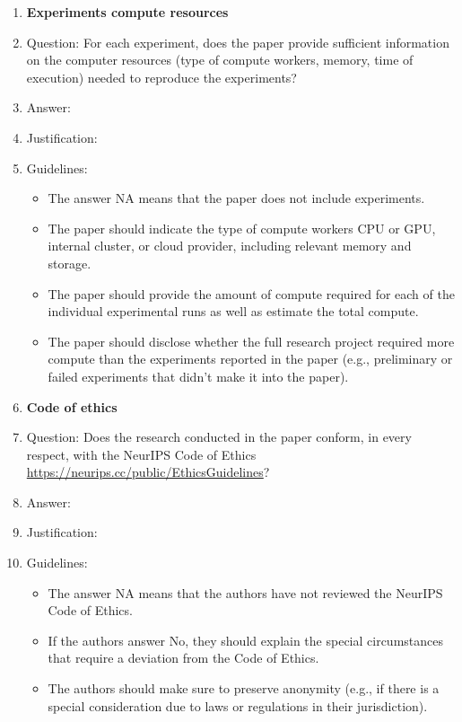 \documentclass{article}
\theoremstyle{definition} \newtheorem{definition}{Definition}  \newtheorem{example}{Example}
\theoremstyle{remark} \newtheorem{remark}{Remark}
\newcounter{ct}
\begin{document}
\begin{enumerate}
\item {\bf Experiments compute resources}
    \item[] Question: For each experiment, does the paper provide sufficient information on the computer resources (type of compute workers, memory, time of execution) needed to reproduce the experiments?
    \item[] Answer: \answerTODO{} %
    \item[] Justification: \justificationTODO{}
    \item[] Guidelines:
    \begin{itemize}
        \item The answer NA means that the paper does not include experiments.
        \item The paper should indicate the type of compute workers CPU or GPU, internal cluster, or cloud provider, including relevant memory and storage.
        \item The paper should provide the amount of compute required for each of the individual experimental runs as well as estimate the total compute. 
        \item The paper should disclose whether the full research project required more compute than the experiments reported in the paper (e.g., preliminary or failed experiments that didn't make it into the paper). 
    \end{itemize}
    
\item {\bf Code of ethics}
    \item[] Question: Does the research conducted in the paper conform, in every respect, with the NeurIPS Code of Ethics \url{https://neurips.cc/public/EthicsGuidelines}?
    \item[] Answer: \answerTODO{} %
    \item[] Justification: \justificationTODO{}
    \item[] Guidelines:
    \begin{itemize}
        \item The answer NA means that the authors have not reviewed the NeurIPS Code of Ethics.
        \item If the authors answer No, they should explain the special circumstances that require a deviation from the Code of Ethics.
        \item The authors should make sure to preserve anonymity (e.g., if there is a special consideration due to laws or regulations in their jurisdiction).
    \end{itemize}



\end{enumerate}
\end{document}
